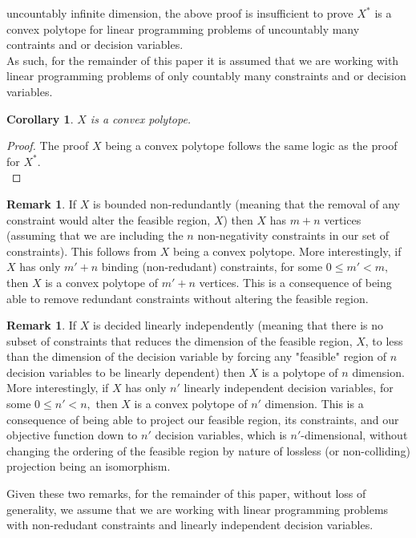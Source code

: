\documentclass[conference]{IEEEtran}
\numberwithin{equation}{section}
\numberwithin{figure}{section}
\theoremstyle{plain}
\newtheorem{cor}[equation]{Corollary}
\theoremstyle{definition}
\newtheorem{remark}[equation]{Remark}
\newcommand{\1}{\ensuremath \mathbbm{1}}
\begin{document}
uncountably infinite dimension, the above proof is insufficient to prove $X^*$ is 
a convex polytope for linear programming problems of uncountably many contraints 
and or decision variables. \\ \hfill \break 
As such, for the remainder of this paper it is assumed that we are working with 
linear programming problems of only countably many constraints and or decision 
variables. \\
\begin{cor}
$X$ is a convex polytope. \\
\end{cor}
\begin{proof}
The proof $X$ being a convex polytope follows the same logic as the proof for 
$X^*$. \\
\end{proof}
\begin{remark}
If $X$ is bounded non-redundantly (meaning that the removal of any constraint 
would alter the feasible region, $X$) then $X$ has $m+n$ vertices (assuming that 
we are including the $n$ non-negativity constraints in our set of constraints). 
This follows from $X$ being a convex polytope. More interestingly, if $X$ has 
only $m' + n$ binding (non-redudant) constraints, for some $0 \leq m' < m,$ then 
$X$ is a convex polytope of $m'+n$ vertices. This is a consequence of being able 
to remove redundant constraints without altering the feasible region. \\ 
\end{remark}
\begin{remark}
If $X$ is decided linearly independently (meaning that there is no subset of 
constraints that reduces the dimension of the feasible region, $X$, to less than 
the dimension of the decision variable by forcing any "feasible" region of $n$ 
decision variables to be linearly dependent) then $X$ is a polytope of $n$ 
dimension. More interestingly, if $X$ has only $n'$ linearly independent decision 
variables, for some $0 \leq n' < n,$ then $X$ is a convex polytope of $n'$ 
dimension. This is a consequence of being able to project our feasible region, 
its constraints, and our objective function down to $n'$ decision variables, 
which is $n'$-dimensional, without changing the ordering of the feasible region 
by nature of lossless (or non-colliding) projection being an isomorphism. \\
\end{remark}
Given these two remarks, for the remainder of this paper, without loss of 
generality, we assume that we are working with linear programming problems with 
non-redudant constraints and linearly independent decision variables. \\
\end{document}
